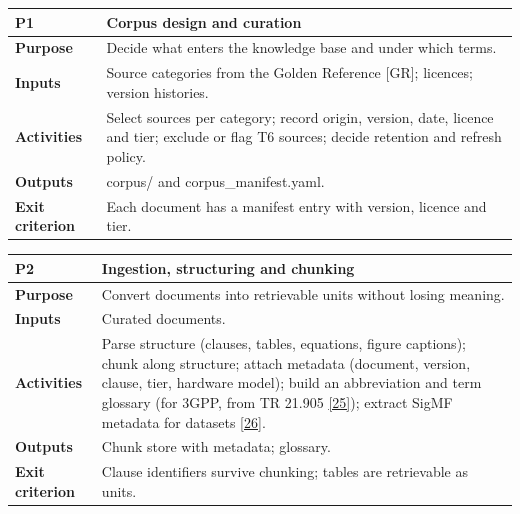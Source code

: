\documentclass[11pt,a4paper]{article}
\newcommand{\prov}[1]{\textsf{\footnotesize[#1]}}
\begin{document}
\vspace{-2pt}
{\small
\begin{longtable}{>{\raggedright\arraybackslash}p{}>{\raggedright\arraybackslash}p{}}
\toprule
\rowcolor{headbg} \textbf{P1} & \textbf{Corpus design and curation} \\
\midrule
\endfirsthead
\bottomrule
\endlastfoot
\textbf{Purpose} & Decide what enters the knowledge base and under which terms. \\ \arrayrulecolor{rulec}\hline\arrayrulecolor{black}
\textbf{Inputs} & Source categories from the Golden Reference \prov{GR}; licences; version histories. \\ \arrayrulecolor{rulec}\hline\arrayrulecolor{black}
\textbf{Activities} & Select sources per category; record origin, version, date, licence and tier; exclude or flag T6 sources; decide retention and refresh policy. \\ \arrayrulecolor{rulec}\hline\arrayrulecolor{black}
\textbf{Outputs} & corpus/ and corpus\_manifest.yaml. \\ \arrayrulecolor{rulec}\hline\arrayrulecolor{black}
\textbf{Exit criterion} & Each document has a manifest entry with version, licence and tier. \\
\end{longtable}
}
\vspace{-2pt}
{\small
\begin{longtable}{>{\raggedright\arraybackslash}p{}>{\raggedright\arraybackslash}p{}}
\toprule
\rowcolor{headbg} \textbf{P2} & \textbf{Ingestion, structuring and chunking} \\
\midrule
\endfirsthead
\bottomrule
\endlastfoot
\textbf{Purpose} & Convert documents into retrievable units without losing meaning. \\ \arrayrulecolor{rulec}\hline\arrayrulecolor{black}
\textbf{Inputs} & Curated documents. \\ \arrayrulecolor{rulec}\hline\arrayrulecolor{black}
\textbf{Activities} & Parse structure (clauses, tables, equations, figure captions); chunk along structure; attach metadata (document, version, clause, tier, hardware model); build an abbreviation and term glossary (for 3GPP, from TR 21.905 \hyperlink{ref25}{[25]}); extract SigMF metadata for datasets \hyperlink{ref26}{[26]}. \\ \arrayrulecolor{rulec}\hline\arrayrulecolor{black}
\textbf{Outputs} & Chunk store with metadata; glossary. \\ \arrayrulecolor{rulec}\hline\arrayrulecolor{black}
\textbf{Exit criterion} & Clause identifiers survive chunking; tables are retrievable as units. \\
\end{longtable}
}
\end{document}
